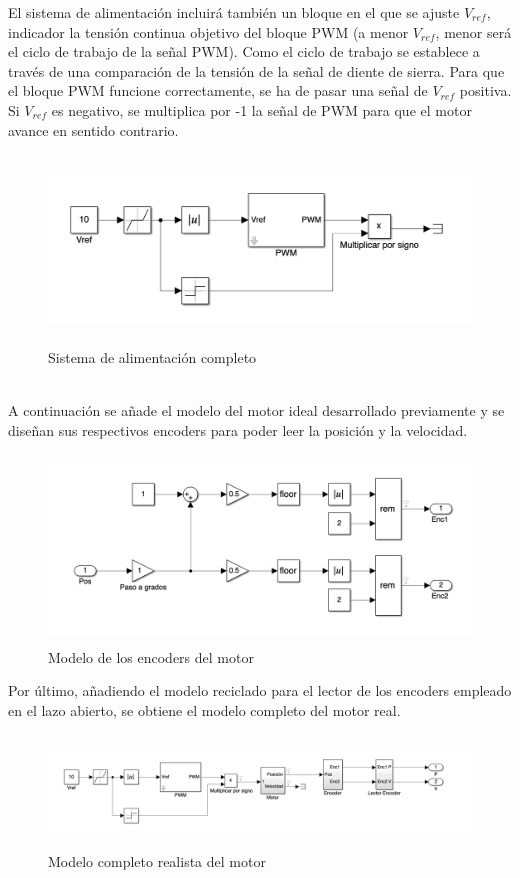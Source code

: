 \documentclass[a4paper, 12pt]{article}
\begin{document}
El sistema de alimentación incluirá también un bloque en el que se ajuste $V_{ref}$, indicador la tensión continua objetivo del bloque PWM (a menor $V_{ref}$, menor será el ciclo de trabajo de la señal PWM). Como el ciclo de trabajo se establece a través de una comparación de la tensión de la señal de diente de sierra. Para que el bloque PWM funcione correctamente, se ha de pasar una señal de $V_{ref}$ positiva. Si $V_{ref}$ es negativo, se multiplica por -1 la señal de PWM para que el motor avance en sentido contrario.\\
\begin{figure}[h!]
	\centering
	\includegraphics[height=5cm]{alimentador}
	\caption{Sistema de alimentación completo}
\end{figure}\\
\newpage
A continuación se añade el modelo del motor ideal desarrollado previamente y se diseñan sus respectivos encoders para poder leer la posición y la velocidad. 
\begin{figure}[h!]
	\centering
	\includegraphics[height = 5cm]{encoders}
	\caption{Modelo de los encoders del motor}
\end{figure}

Por último, añadiendo el modelo reciclado para el lector de los encoders empleado en el lazo abierto, se obtiene el modelo completo del motor real.  
\begin{figure}[h!]
	\centering
	\includegraphics[height = 3cm]{real_completo}
	\caption{Modelo completo realista del motor}
\end{figure}
\end{document}
